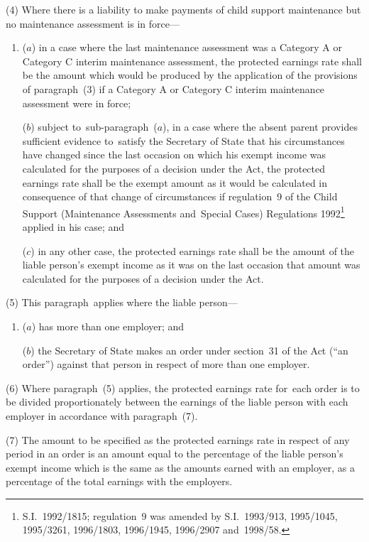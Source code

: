 \documentclass[12pt,a4paper]{article}
\begin{document}
(4) Where there is a liability to make payments of child support maintenance but no maintenance assessment is in force—
\begin{enumerate}\item[]
($a$) in a case where the last maintenance assessment was a Category A or Category C interim maintenance assessment, the protected earnings rate shall be the amount which would be produced by the application of the provisions of paragraph~(3) if a Category A or Category C interim maintenance assessment were in force;

($b$) subject to~sub-paragraph~($a$), in a case where the absent parent provides sufficient evidence to~satisfy the Secretary of State that his circumstances have changed since the last occasion on which his exempt income was calculated for the purposes of a decision under the Act, the protected earnings rate shall be the exempt amount as it would be calculated in consequence of that change of circumstances if regulation~9 of the Child Support (Maintenance Assessments and~Special Cases) Regulations 1992\footnote{\frenchspacing S.I.~1992/1815; regulation~9 was amended by S.I.~1993/913, 1995/1045, 1995/3261, 1996/1803, 1996/1945, 1996/2907 and~1998/58.} applied in his case; and

($c$) in any other case, the protected earnings rate shall be the amount of the liable person’s exempt income as it was on the last occasion that amount was calculated for the purposes of a decision under the Act.
\end{enumerate}

(5) This paragraph~applies where the liable person—
\begin{enumerate}\item[]
($a$) has more than one employer; and

($b$) the Secretary of State makes an order under section~31 of the Act (“an order”) against that person in respect of more than one employer.
\end{enumerate}

(6) Where paragraph~(5) applies, the protected earnings rate for~each order is to be divided proportionately between the earnings of the liable person with each employer in accordance with paragraph~(7).

(7) The amount to be specified as the protected earnings rate in respect of any period in an order is an amount equal to the percentage of the liable person’s exempt income which is the same as the amounts earned with an employer, as a percentage of the total earnings with the employers.
\end{document}
